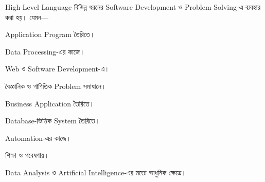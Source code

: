 
High Level Language বিভিন্ন ধরনের Software Development ও
Problem Solving-এ ব্যবহার করা হয়। যেমন—

\begin{compacttwocolpoints}

\item Application Program তৈরিতে।

\item Data Processing-এর কাজে।

\item Web ও Software Development-এ।

\item বৈজ্ঞানিক ও গাণিতিক Problem সমাধানে।

\item Business Application তৈরিতে।

\item Database-ভিত্তিক System তৈরিতে।

\item Automation-এর কাজে।

\item শিক্ষা ও গবেষণায়।

\item Data Analysis ও Artificial Intelligence-এর মতো আধুনিক ক্ষেত্রে।

\end{compacttwocolpoints}


